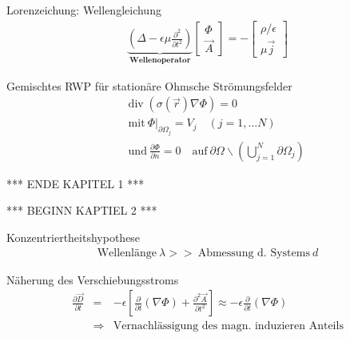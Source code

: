 \documentclass[a6paper]{kartei}
\renewcommand{\div}{\mathrm{div}\;}
\begin{document}
\begin{karte}{Lorenzeichung: Wellengleichung}
 \begin{eqnarray}
  \underbrace{(\Delta - \epsilon \mu \frac{\partial^{2}}{\partial t^{2}})}_{\textbf{Wellenoperator}} \begin{bmatrix} \Phi \\ \vec{A} \end{bmatrix} = - \begin{bmatrix} \rho/\epsilon \\ \mu\vec{j} \end{bmatrix}
  \end{eqnarray}
\end{karte}

\begin{karte}{Gemischtes RWP für stationäre Ohmsche Strömungsfelder}
\begin{eqnarray}
 & & \div(\sigma(\vec{r}) \nabla \Phi)  =  0 \\
 & & \text{mit} \  \Phi|_{\partial \Omega_{j}} = V_{j} \quad (j = 1, \dots N) \nonumber \\  & & \text{und} \  \frac{\partial \Phi}{\partial n} = 0 \quad \text{auf} \ \partial \Omega \backslash \left( \bigcup\limits_{j=1}^{N} \partial \Omega_{j}\right)
\end{eqnarray}\end{karte}

*** ENDE KAPITEL 1 *** %

*** BEGINN KAPTIEL 2 *** %


\begin{karte}{Konzentriertheitshypothese}
\begin{eqnarray}
 \text{Wellenlänge} \ \lambda >> \ \text{Abmessung d. Systems} \ d
\end{eqnarray}
\end{karte}

\begin{karte}{Näherung des Verschiebungsstroms}
\begin{eqnarray}
 \frac{\partial \vec{D}}{\partial t} & = & - \epsilon \left[ \frac{\partial}{\partial t} (\nabla \Phi) + \frac{\partial^{2} \vec{A}}{\partial  t^{2}} \right] \approx - \epsilon \frac{\partial}{\partial t} (\nabla \Phi) \\
& \Rightarrow & \text{Vernachlässigung des magn. induzieren Anteils} \nonumber
\end{eqnarray}
\end{karte}
\end{document}
